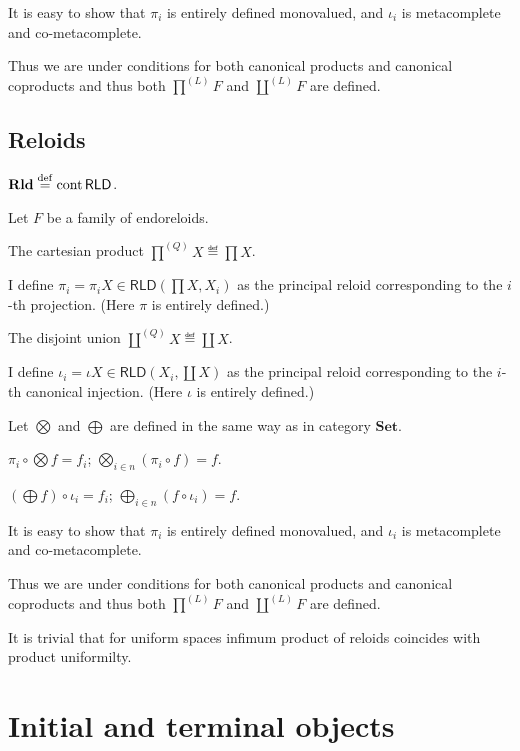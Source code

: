 It is easy to show that $\pi_i$ is entirely defined monovalued, and $\iota_i$
is metacomplete and co-metacomplete.

Thus we are under conditions for both canonical products and canonical
coproducts and thus both $\prod^{(L)} F$ and $\coprod^{(L)} F$ are defined.

\subsection{Reloids}

\begin{defn}
  $\mathbf{Rld} \overset{\mathrm{def}}{=} \operatorname{cont} \mathsf{RLD}$.
\end{defn}

Let $F$ be a family of endoreloids.

The cartesian product $\prod^{(Q)} X \eqdef \prod X$.

I define $\pi_i = \pi_i X \in \mathsf{RLD} \left( \prod X , X_i
\right)$ as the principal reloid corresponding to the $i$-th projection. (Here
$\pi$ is entirely defined.)

The disjoint union $\coprod^{(Q)} X \eqdef \coprod X$.

I define $\iota_i = \iota X \in
\mathsf{RLD} \left( X_i , \coprod X \right)$ as the principal reloid
corresponding to the $i$-th canonical injection. (Here $\iota$ is entirely
defined.)

Let $\bigotimes$ and $\bigoplus$ are defined in the same way as in category
$\mathbf{Set}$.

\begin{obvious}
$\pi_i \circ \bigotimes f = f_i$; $\bigotimes_{i \in n} (\pi_i \circ f) =
f$.
\end{obvious}

\begin{obvious}
$\left( \bigoplus f \right) \circ \iota_i = f_i$; $\bigoplus_{i \in n} (f
\circ \iota_i) = f$.
\end{obvious}

It is easy to show that $\pi_i$ is entirely defined monovalued, and $\iota_i$
is metacomplete and co-metacomplete.

Thus we are under conditions for both canonical products and canonical
coproducts and thus both $\prod^{(L)} F$ and $\coprod^{(L)} F$ are defined.

It is trivial that for uniform spaces infimum product of reloids coincides
with product uniformilty.

\section{Initial and terminal objects}

